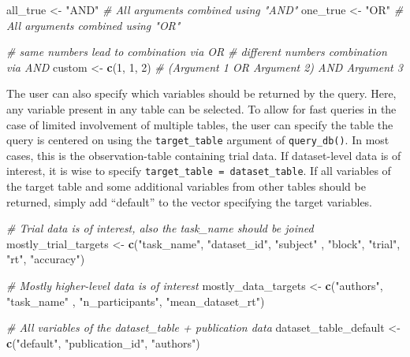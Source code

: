 \documentclass[
  man,floatsintext]{apa6}
\newenvironment{Shaded}{\begin{snugshade}}{\end{snugshade}}
\newcommand{\CommentTok}[1]{\textcolor[rgb]{0.56,0.35,0.01}{\textit{#1}}}
\newcommand{\DecValTok}[1]{\textcolor[rgb]{0.00,0.00,0.81}{#1}}
\newcommand{\FunctionTok}[1]{\textcolor[rgb]{0.13,0.29,0.53}{\textbf{#1}}}
\newcommand{\NormalTok}[1]{#1}
\newcommand{\OtherTok}[1]{\textcolor[rgb]{0.56,0.35,0.01}{#1}}
\newcommand{\StringTok}[1]{\textcolor[rgb]{0.31,0.60,0.02}{#1}}
\begin{document}
\begin{Shaded}
\begin{Highlighting}[]
\NormalTok{all\_true }\OtherTok{\textless{}{-}} \StringTok{"AND"} \CommentTok{\# All arguments combined using "AND"}
\NormalTok{one\_true }\OtherTok{\textless{}{-}} \StringTok{"OR"} \CommentTok{\# All arguments combined using "OR"}

\CommentTok{\# same numbers lead to combination via OR}
\CommentTok{\# different numbers combination via AND}
\NormalTok{custom }\OtherTok{\textless{}{-}} \FunctionTok{c}\NormalTok{(}\DecValTok{1}\NormalTok{, }\DecValTok{1}\NormalTok{, }\DecValTok{2}\NormalTok{) }\CommentTok{\# (Argument 1 OR Argument 2) AND Argument 3}
\end{Highlighting}
\end{Shaded}

The user can also specify which variables should be returned by the query. Here, any variable present in any table can be selected. To allow for fast queries in the case of limited involvement of multiple tables, the user can specify the table the query is centered on using the \texttt{target\_table} argument of \texttt{query\_db()}. In most cases, this is the observation-table containing trial data. If dataset-level data is of interest, it is wise to specify \texttt{target\_table\ =\ dataset\_table}. If all variables of the target table and some additional variables from other tables should be returned, simply add ``default'' to the vector specifying the target variables.

\begin{Shaded}
\begin{Highlighting}[]
\CommentTok{\# Trial data is of interest, also the task\_name should be joined}
\NormalTok{mostly\_trial\_targets }\OtherTok{\textless{}{-}} \FunctionTok{c}\NormalTok{(}\StringTok{"task\_name"}\NormalTok{, }\StringTok{"dataset\_id"}\NormalTok{, }\StringTok{"subject"}
\NormalTok{                          , }\StringTok{"block"}\NormalTok{, }\StringTok{"trial"}\NormalTok{, }\StringTok{"rt"}\NormalTok{, }\StringTok{"accuracy"}\NormalTok{)}

\CommentTok{\# Mostly higher{-}level data is of interest}
\NormalTok{mostly\_data\_targets }\OtherTok{\textless{}{-}} \FunctionTok{c}\NormalTok{(}\StringTok{"authors"}\NormalTok{, }\StringTok{"task\_name"}
\NormalTok{                         , }\StringTok{"n\_participants"}\NormalTok{, }\StringTok{"mean\_dataset\_rt"}\NormalTok{)}

\CommentTok{\# All variables of the dataset\_table + publication data}
\NormalTok{dataset\_table\_default }\OtherTok{\textless{}{-}} \FunctionTok{c}\NormalTok{(}\StringTok{"default"}\NormalTok{, }\StringTok{"publication\_id"}\NormalTok{, }\StringTok{"authors"}\NormalTok{)}
\end{Highlighting}
\end{Shaded}
\end{document}
